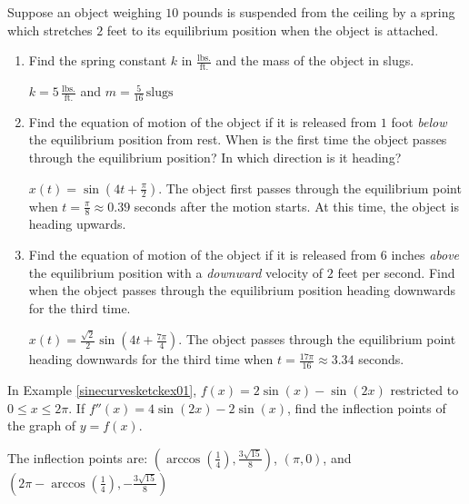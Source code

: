 \documentclass{ximera}
\begin{document}
\begin{problem}
Suppose an object weighing $10$ pounds is suspended from the ceiling by a spring which stretches $2$ feet to its equilibrium position when the object is attached.  

\begin{enumerate}

\item  Find the spring constant $k$ in $\frac{\text{lbs.}}{\text{ft.}}$ and the mass of the object in slugs.

\begin{solution}
$k = 5 \, \frac{\text{lbs.}}{\text{ft.}}$ and $m = \frac{5}{16} \, \text{slugs}$
\end{solution}

\item  Find the equation of motion of the object if it is released from $1$ foot \textit{below} the equilibrium position from rest.  When is the first time the object passes through the equilibrium position? In which direction is it heading?

\begin{solution}
$x(t) = \sin\left(4t + \frac{\pi}{2}\right)$.  The object first passes through the equilibrium point when $t = \frac{\pi}{8} \approx 0.39$ seconds after the motion starts.  At this time, the object is heading upwards.
\end{solution}

\item  Find the equation of motion of the object if it is released from $6$ inches \textit{above} the equilibrium position with a \textit{downward} velocity of $2$ feet per second.  Find when the object passes through the equilibrium position heading downwards for the third time.

\begin{solution}
$x(t) = \frac{\sqrt{2}}{2} \sin\left(4t + \frac{7\pi}{4}\right)$.  The object passes through the equilibrium point heading downwards for the third time when $t = \frac{17\pi}{16} \approx 3.34$ seconds.
\end{solution}

\end{enumerate}

\end{problem}

\begin{problem} \label{sinecurvesketckex01IPs} 
In Example \ref{sinecurvesketckex01},  $f(x) = 2\sin(x) - \sin(2x)$  restricted to $0 \leq x \leq 2\pi$.  If $f''(x) = 4 \sin(2x) - 2\sin(x)$,  find the inflection points of the graph of $y = f(x)$.

\begin{solution}
The inflection points are:  $\left( \arccos\left(\frac{1}{4}\right), \frac{3 \sqrt{15}}{8} \right)$, $( \pi, 0)$, and $\left( 2\pi - \arccos\left(\frac{1}{4}\right), - \frac{3 \sqrt{15}}{8} \right)$
\end{solution}
\end{problem}
\end{document}
